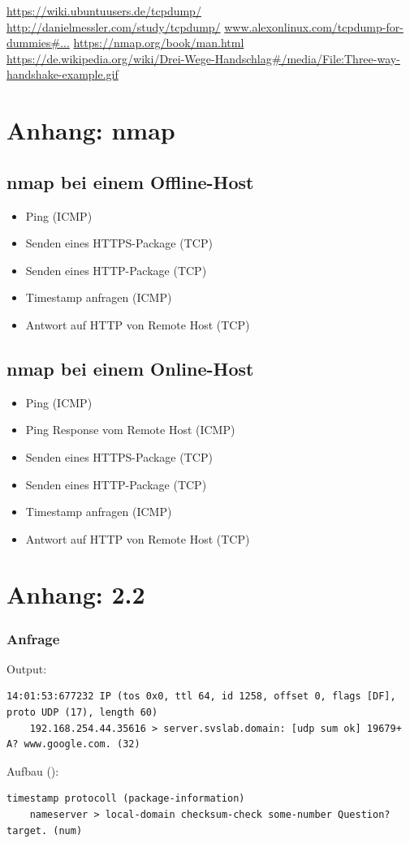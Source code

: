 \documentclass[twoside]{article}
\begin{document}
\newpage
\begin{thebibliography}{1}
		\url{https://wiki.ubuntuusers.de/tcpdump/}
		\url{http://danielmessler.com/study/tcpdump/}
			\url{www.alexonlinux.com/tcpdump-for-dummies\#...}
			\url{https://nmap.org/book/man.html}
			\url{https://de.wikipedia.org/wiki/Drei-Wege-Handschlag#/media/File:Three-way-handshake-example.gif}
\end{thebibliography}
\newpage
\section*{Anhang: nmap}
\subsection*{nmap bei einem Offline-Host}
\label{nmap-off}
	\begin{itemize}
			\item Ping (ICMP)
			\item Senden eines HTTPS-Package (TCP)
			\item Senden eines HTTP-Package (TCP)
			\item Timestamp anfragen (ICMP)
			\item Antwort auf HTTP von Remote Host (TCP)
		\end{itemize}
\subsection*{nmap bei einem Online-Host}
\label{nmap-on}
	\begin{itemize}
			\item Ping (ICMP)
			\item Ping Response vom Remote Host (ICMP)
			\item Senden eines HTTPS-Package (TCP)
			\item Senden eines HTTP-Package (TCP)
			\item Timestamp anfragen (ICMP)
			\item Antwort auf HTTP von Remote Host (TCP)
		\end{itemize}
\section*{Anhang: 2.2}
\subsubsection{Anfrage}
Output:
\begin{lstlisting}
14:01:53:677232 IP (tos 0x0, ttl 64, id 1258, offset 0, flags [DF], proto UDP (17), length 60)
    192.168.254.44.35616 > server.svslab.domain: [udp sum ok] 19679+ A? www.google.com. (32)
\end{lstlisting}
Aufbau (\cite{alex}):
\begin{lstlisting}
timestamp protocoll (package-information)
	nameserver > local-domain checksum-check some-number Question? target. (num)
\end{lstlisting}
\end{document}
